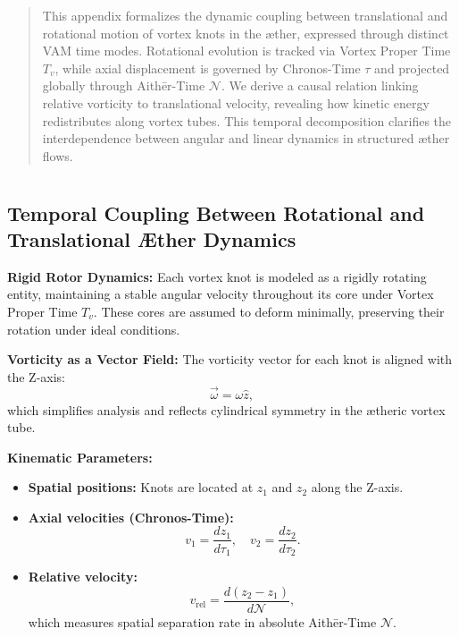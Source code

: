 \documentclass[12pt]{article}
\begin{document}
    \titlepageOpen

    \begin{abstract}
        This appendix formalizes the dynamic coupling between translational and rotational motion of vortex knots in the æther, expressed through distinct VAM time modes. Rotational evolution is tracked via Vortex Proper Time \( T_v \), while axial displacement is governed by Chronos-Time \( \tau \) and projected globally through Aithēr-Time \( \mathcal{N} \). We derive a causal relation linking relative vorticity to translational velocity, revealing how kinetic energy redistributes along vortex tubes. This temporal decomposition clarifies the interdependence between angular and linear dynamics in structured æther flows.
    \end{abstract}


    \titlepageClose
    \fi

    \section{\papertitle}

    \subsection*{Temporal Coupling Between Rotational and Translational Æther Dynamics}

    \textbf{Rigid Rotor Dynamics:} Each vortex knot is modeled as a rigidly rotating entity, maintaining a stable angular velocity throughout its core under Vortex Proper Time \( T_v \). These cores are assumed to deform minimally, preserving their rotation under ideal conditions.

    \textbf{Vorticity as a Vector Field:} The vorticity vector for each knot is aligned with the Z-axis:
    \begin{equation*}
        \vec{\omega} = \omega \hat{z},
    \end{equation*}
    which simplifies analysis and reflects cylindrical symmetry in the ætheric vortex tube.

    \textbf{Kinematic Parameters:}
    \begin{itemize}
        \item \textbf{Spatial positions:} Knots are located at \( z_1 \) and \( z_2 \) along the Z-axis.
        \item \textbf{Axial velocities (Chronos-Time):}
        \begin{equation*}
            v_1 = \frac{dz_1}{d\tau_1}, \quad v_2 = \frac{dz_2}{d\tau_2}.
        \end{equation*}
        \item \textbf{Relative velocity:}
        \begin{equation*}
            v_\text{rel} = \frac{d(z_2 - z_1)}{d\mathcal{N}},
        \end{equation*}
        which measures spatial separation rate in absolute Aithēr-Time \( \mathcal{N} \).
    \end{itemize}
\end{document}
